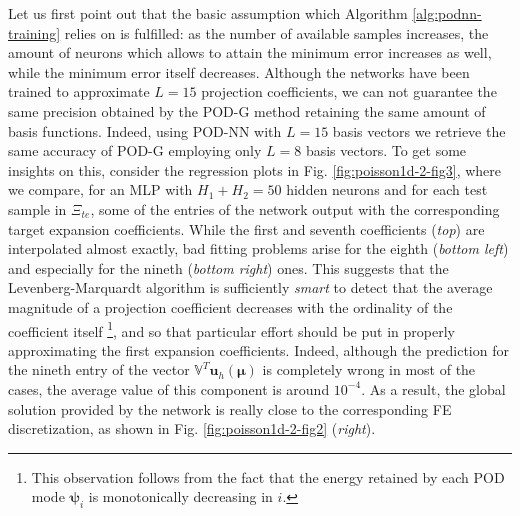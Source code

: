 \documentclass[12pt, a4paper, twoside, openright, notitlepage]{report}
\numberwithin{equation}{chapter}
\theoremstyle{theorem}
\theoremstyle{definition}
\theoremstyle{remark}
\theoremstyle{proposition}
\numberwithin{figure}{chapter}
\newcommand{\bg}[1]{\boldsymbol{#1}}
\begin{document}
		Let us first point out that the basic assumption which Algorithm \ref{alg:podnn-training} relies on is fulfilled: as the number of available samples increases, the amount of neurons which allows to attain the minimum error increases as well, while the minimum error itself decreases. Although the networks have been trained to approximate $L = 15$ projection coefficients, we can not guarantee the same precision obtained by the POD-G method retaining the same amount of basis functions. Indeed, using POD-NN with $L = 15$ basis vectors we retrieve the same accuracy of POD-G employing only $L = 8$ basis vectors. To get some insights on this, consider the regression plots in Fig. \ref{fig:poisson1d-2-fig3}, where we compare, for an MLP with $H_1 + H_2 = 50$ hidden neurons and for each test sample in $\Xi_{te}$, some of the entries of the network output with the corresponding target expansion coefficients. While the first and seventh coefficients (\emph{top}) are interpolated almost exactly, bad fitting problems arise for the eighth (\emph{bottom left}) and especially for the nineth (\emph{bottom right}) ones. This suggests that the Levenberg-Marquardt algorithm is sufficiently \emph{smart} to detect that the average magnitude of a projection coefficient decreases with the ordinality of the coefficient itself \footnote{This observation follows from the fact that the energy retained by each POD mode $\bg{\psi}_i$ is monotonically decreasing in $i$.}, and so that particular effort should be put in properly approximating the first expansion coefficients. Indeed, although the prediction for the nineth entry of the vector $\mathbb{V}^T \mathbf{u}_h(\bg{\mu})$ is completely wrong in most of the cases, the average value of this component is around $10^{-4}$. As a result, the global solution provided by the network is really close to the corresponding FE discretization, as shown in Fig. \ref{fig:poisson1d-2-fig2} (\emph{right}).
		
		\clearpage
				
\end{document}
